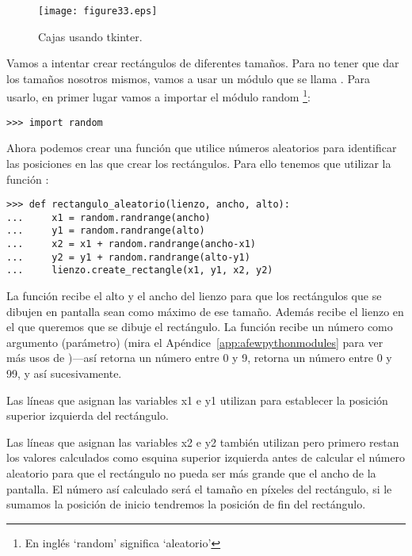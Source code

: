 \begin{figure}
\begin{center}
\texttt{[image: figure33.eps]}
\end{center}
\caption{Cajas usando tkinter.}\label{fig33}
\end{figure}

Vamos a intentar crear rectángulos de diferentes tamaños.  Para no tener que dar los tamaños nosotros mismos, vamos a usar un módulo que se llama . Para usarlo, en primer lugar vamos a importar el módulo random \footnote{En inglés `random' significa `aleatorio'}:

\begin{listing}
\begin{verbatim}
>>> import random
\end{verbatim}
\end{listing}

Ahora podemos crear una función que utilice números aleatorios para identificar las posiciones en las que crear los rectángulos.  Para ello tenemos que utilizar la función :

\begin{listing}
\begin{verbatim}
>>> def rectangulo_aleatorio(lienzo, ancho, alto):
...     x1 = random.randrange(ancho)
...     y1 = random.randrange(alto)
...     x2 = x1 + random.randrange(ancho-x1)
...     y2 = y1 + random.randrange(alto-y1)
...     lienzo.create_rectangle(x1, y1, x2, y2)
\end{verbatim}
\end{listing}

La función recibe el alto y el ancho del lienzo para que los rectángulos que se dibujen en pantalla sean como máximo de ese tamaño. Además recibe el lienzo en el que queremos que se dibuje el rectángulo.  La función  recibe un número como argumento (parámetro) (mira el Apéndice~\ref{app:afewpythonmodules} para ver más usos de )---así  retorna un número entre 0 y 9,  retorna un número entre 0 y 99, y así sucesivamente. 

Las líneas que asignan las variables x1 e y1 utilizan  para establecer la posición superior izquierda del rectángulo.

Las líneas que asignan las variables x2 e y2 también utilizan  pero primero restan los valores calculados como esquina superior izquierda antes de calcular el número aleatorio para que el rectángulo no pueda ser más grande que el ancho de la pantalla. El número así calculado será el tamaño en píxeles del rectángulo, si le sumamos la posición de inicio tendremos la posición de fin del rectángulo.

